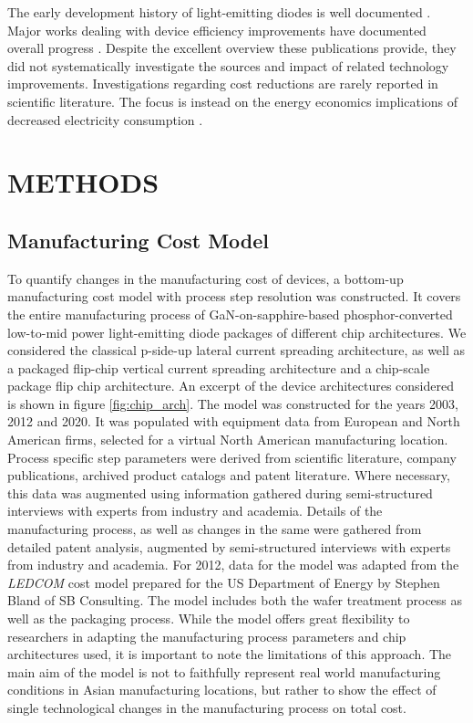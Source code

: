 \documentclass[a4paper,nocompress]{spie}  %
\begin{document}
    The early development history of light-emitting diodes is well documented \cite{Steigerwald2002}\cite{Nakamura2013}\cite{feezell2018invention}. Major works dealing with device efficiency improvements have documented overall progress \cite{azevedo2009transition}\cite{tsao2010solid}\cite{pattison2017solid}. Despite the excellent overview these publications provide, they did not systematically investigate the sources and impact of related technology improvements. Investigations regarding cost reductions are rarely reported in scientific literature. The focus is instead on the energy economics implications of decreased electricity consumption \cite{tsao2010world}\cite{Tsao2010SSL}. 

\clearpage
\section{METHODS}
\label{sec:methods}

    \subsection{Manufacturing Cost Model}

        To quantify changes in the manufacturing cost of devices, a bottom-up manufacturing cost model with process step resolution was constructed. It covers the entire manufacturing process of GaN-on-sapphire-based phosphor-converted low-to-mid power light-emitting diode packages of different chip architectures. We considered the classical p-side-up lateral current spreading architecture, as well as a packaged flip-chip vertical current spreading architecture and a chip-scale package flip chip architecture. An excerpt of the device architectures considered is shown in figure \ref{fig:chip_arch}. The model was constructed for the years 2003, 2012 and 2020. It was populated with equipment data from European and North American firms, selected for a virtual North American manufacturing location. Process specific step parameters were derived from scientific literature, company publications, archived product catalogs and patent literature. Where necessary, this data was augmented using information gathered during semi-structured interviews with experts from industry and academia. Details of the manufacturing process, as well as changes in the same were gathered from detailed patent analysis, augmented by semi-structured interviews with experts from industry and academia. For 2012, data for the model was adapted from the \textit{LEDCOM} cost model prepared for the US Department of Energy by Stephen Bland of SB Consulting\cite{ledcomv2}. The model includes both the wafer treatment process as well as the packaging process. While the model offers great flexibility to researchers in adapting the manufacturing process parameters and chip architectures used, it is important to note the limitations of this approach. The main aim of the model is not to faithfully represent real world manufacturing conditions in Asian manufacturing locations, but rather to show the effect of single technological changes in the manufacturing process on total cost. 
\end{document}

